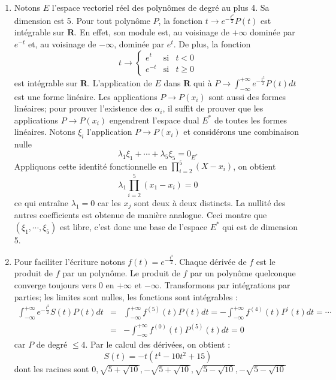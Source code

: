 \begin{enumerate}
\item  Notons $E$ l'espace vectoriel r\'{e}el des polyn\^{o}mes de degr\'{e}
au plus 4$.$ Sa dimension est 5.\newline
Pour tout polyn\^{o}me $P$, la fonction $t\rightarrow e^{-\frac{t^{2}}{2}%
}P(t)$ est int\'{e}grable sur $\mathbf{R}$. En effet, son module est, au
voisinage de $+\infty $ domin\'{e}e par $e^{-t}$ et, au voisinage de $%
-\infty $, domin\'{e}e par $e^{t}$. De plus, la fonction 
\[
t\rightarrow \left\{ 
\begin{array}{ccc}
e^{t} & \text{si} & t<0 \\ 
e^{-t} & \text{si} & t\geq 0
\end{array}
\right. 
\]
est int\'{e}grable sur $\mathbf{R}$.\newline
L'application de $E$ dans $\mathbf{R}$ qui \`{a} $P\rightarrow \int_{-\infty
}^{+\infty }e^{-\frac{t^{2}}{2}}P(t)dt$ est une forme lin\'{e}aire. Les
applications $P\rightarrow P(x_{i})$ sont aussi des formes lin\'{e}aires;
pour prouver l'existence des $\alpha _{i}$, il suffit de prouver que les
applications $P\rightarrow P(x_{i})$ engendrent l'espace dual $E^{*}$ de
toutes les formes lin\'{e}aires.\newline
Notons $\xi _{i}$ l'application $P\rightarrow P(x_{i})$ et consid\'{e}rons
une combinaison nulle 
\[
\lambda _{1}\xi _{1}+\cdots +\lambda _{5}\xi _{5}=0_{E^{*}}
\]
Appliquons cette identit\'{e} fonctionnelle en $\prod_{i=2}^{5}(X-x_{i})$,
on obtient 
\[
\lambda _{1}\prod_{i=2}^{5}(x_{1}-x_{i})=0
\]
ce qui entra\^{i}ne $\lambda _{1}=0$ car les $x_{j}$ sont deux \`{a} deux
distincts. La nullit\'{e} des autres coefficients est obtenue de mani\`{e}re
analogue. Ceci montre que $(\xi _{1},\cdots ,\xi _{5})$ est libre, c'est
donc une base de l'espace $E^{*}$ qui est de dimension 5$.$

\item  Pour faciliter l'\'{e}criture notons $f(t)=e^{-\frac{t^{2}}{2}}$.
Chaque d\'{e}riv\'{e}e de $f$ est le produit de $f$ par un polyn\^{o}me. Le
produit de $f$ par un polyn\^{o}me quelconque converge toujours vers 0 en $%
+\infty $ et $-\infty $.\newline
Transformons par int\'{e}grations par parties; les limites sont nulles, les
fonctions sont int\'{e}grables : 
\begin{eqnarray*}
\int_{-\infty }^{+\infty }e^{-\frac{t^{2}}{2}}S(t)P(t)dt &=&\int_{-\infty
}^{+\infty }f^{(5)}(t)P(t)dt=-\int_{-\infty }^{+\infty }f^{(4)}(t)P^{\prime
}(t)dt=\cdots \\
&=&-\int_{-\infty }^{+\infty }f^{(0)}(t)P^{(5)}(t)dt=0
\end{eqnarray*}
car $P$ de degr\'{e} $\leq 4$.\newline
Par le calcul des d\'{e}riv\'{e}es, on obtient : 
\[
S(t)=-t(t^{4}-10t^{2}+15) 
\]
dont les racines sont $0,\sqrt{5+\sqrt{10}},-\sqrt{5+\sqrt{10}},\sqrt{5-%
\sqrt{10}},-\sqrt{5-\sqrt{10}}$


\end{enumerate}
